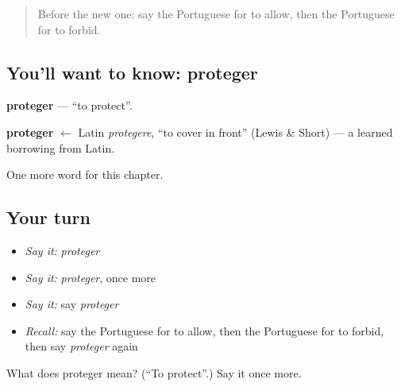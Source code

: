 \begin{quote}
Before the new one: say the Portuguese for to allow, then the Portuguese for to forbid.
\end{quote}

\subsection*{You'll want to know: proteger}
\textbf{proteger} — \textquotedblleft{}to protect\textquotedblright{}.

\begin{cousinweb}
\textbf{proteger} $\leftarrow$ Latin \emph{protegere}, \textquotedblleft{}to cover in front\textquotedblright{} (Lewis \& Short) — a learned borrowing from Latin.
\end{cousinweb}

\begin{grammarlens}[title={What you've built}]
One more word for this chapter.
\end{grammarlens}

\subsection*{Your turn}
\begin{itemize}
\raggedright
  \item \emph{Say it:} \emph{proteger}
  \item \emph{Say it:} \emph{proteger}, once more
  \item \emph{Say it:} say \emph{proteger}
  \item \emph{Recall:} say the Portuguese for to allow, then the Portuguese for to forbid, then say \emph{proteger} again
\end{itemize}

\begin{tcolorbox}[breakable,colback=teal!4,colframe=teal!35!black,title={Before you move on}]
What does proteger mean? (\textquotedblleft{}To protect\textquotedblright{}.) Say it once more.
\end{tcolorbox}

